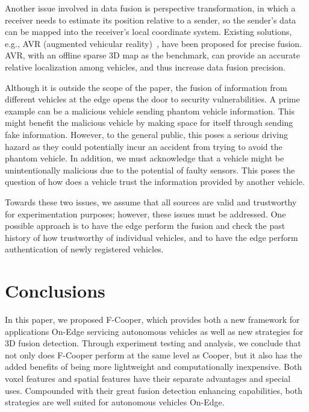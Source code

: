 \documentclass[sigconf]{acmart}
\begin{document}
Another issue involved in data fusion is perspective transformation, in which a receiver needs to estimate its position relative to a sender, so the sender's data can be mapped into the receiver's local coordinate system.
Existing solutions, e.g.,  AVR (augmented vehicular reality)~\cite{qiu2018avr}, have been proposed for precise fusion. 
AVR, with an offline sparse 3D map as the benchmark, can provide an accurate relative localization among vehicles, and thus increase data fusion precision. 



Although it is outside the scope of the paper, the fusion of information from different vehicles at the edge opens the door to security vulnerabilities. A prime example can be a malicious vehicle sending phantom vehicle information. This might benefit the malicious vehicle by making space for itself through sending fake information. However, to the general public, this poses a serious driving hazard as they could potentially incur an accident from trying to avoid the phantom vehicle. In addition, we must acknowledge that a vehicle might be unintentionally malicious due to the potential of faulty sensors. This poses the question of how does a vehicle trust the information provided by another vehicle.

Towards these two issues, we assume that all sources are valid and trustworthy for experimentation purposes; however, these issues must be addressed. One possible approach is to have the edge perform the fusion and check the past history of how trustworthy of individual vehicles, and to have the edge perform authentication of newly registered vehicles. 




\section{Conclusions}
In this paper, we proposed F-Cooper, which provides both a new framework for applications On-Edge servicing autonomous vehicles as well as new strategies for 3D fusion detection. Through experiment testing and analysis, we conclude that not only does F-Cooper perform at the same level as Cooper, but it also has the added benefits of being more lightweight and computationally inexpensive. Both voxel features and spatial features have their separate advantages and special uses. Compounded with their great fusion detection enhancing capabilities, both strategies are well suited for autonomous vehicles On-Edge. 
\end{document}
